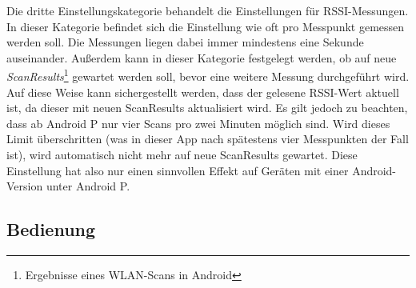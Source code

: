 \documentclass[10pt]{scrartcl}
\begin{document}
Die dritte Einstellungskategorie behandelt die Einstellungen für RSSI-Messungen. In dieser Kategorie befindet sich die Einstellung wie oft pro Messpunkt gemessen werden soll. Die Messungen liegen dabei immer mindestens eine Sekunde auseinander. Außerdem kann in dieser Kategorie festgelegt werden, ob auf neue \textit{ScanResults}\footnote{Ergebnisse eines WLAN-Scans in Android} gewartet werden soll, bevor eine weitere Messung durchgeführt wird. Auf diese Weise kann sichergestellt werden, dass der gelesene RSSI-Wert aktuell ist, da dieser mit neuen ScanResults aktualisiert wird. Es gilt jedoch zu beachten, dass ab Android P nur vier Scans pro zwei Minuten möglich sind. Wird dieses Limit überschritten (was in dieser App nach spätestens vier Messpunkten der Fall ist), wird automatisch nicht mehr auf neue ScanResults gewartet. Diese Einstellung hat also nur einen sinnvollen Effekt auf Geräten mit einer Android-Version unter Android P.

\subsection{Bedienung}
\end{document}
